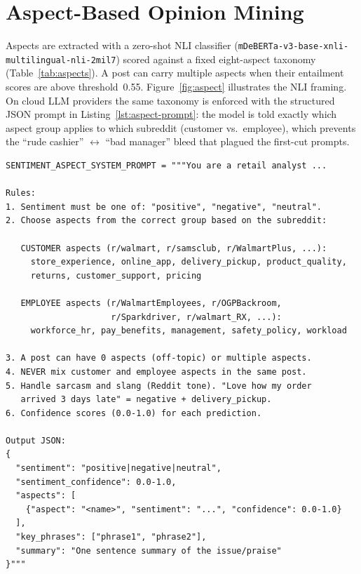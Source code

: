 \section{Aspect-Based Opinion Mining}\label{sec:aspect}
Aspects are extracted with a zero-shot NLI classifier
(\texttt{mDeBERTa-v3-base-xnli-multilingual-nli-2mil7}) scored against a fixed
eight-aspect taxonomy (Table~\ref{tab:aspects}).  A post can carry multiple
aspects when their entailment scores are above threshold~0.55.
Figure~\ref{fig:aspect} illustrates the NLI framing.  On cloud LLM
providers the same taxonomy is enforced with the structured JSON prompt in
Listing~\ref{lst:aspect-prompt}: the model is told exactly which aspect
group applies to which subreddit (customer vs.\ employee), which prevents
the ``rude cashier'' $\leftrightarrow$ ``bad manager'' bleed that
plagued the first-cut prompts.

\begin{lstlisting}[caption={Aspect taxonomy enforced in the JSON-mode system prompt ({\tt src/analysis/prompts.py}).},label={lst:aspect-prompt}]
SENTIMENT_ASPECT_SYSTEM_PROMPT = """You are a retail analyst ...

Rules:
1. Sentiment must be one of: "positive", "negative", "neutral".
2. Choose aspects from the correct group based on the subreddit:

   CUSTOMER aspects (r/walmart, r/samsclub, r/WalmartPlus, ...):
     store_experience, online_app, delivery_pickup, product_quality,
     returns, customer_support, pricing

   EMPLOYEE aspects (r/WalmartEmployees, r/OGPBackroom,
                     r/Sparkdriver, r/walmart_RX, ...):
     workforce_hr, pay_benefits, management, safety_policy, workload

3. A post can have 0 aspects (off-topic) or multiple aspects.
4. NEVER mix customer and employee aspects in the same post.
5. Handle sarcasm and slang (Reddit tone). "Love how my order
   arrived 3 days late" = negative + delivery_pickup.
6. Confidence scores (0.0-1.0) for each prediction.

Output JSON:
{
  "sentiment": "positive|negative|neutral",
  "sentiment_confidence": 0.0-1.0,
  "aspects": [
    {"aspect": "<name>", "sentiment": "...", "confidence": 0.0-1.0}
  ],
  "key_phrases": ["phrase1", "phrase2"],
  "summary": "One sentence summary of the issue/praise"
}"""
\end{lstlisting}

